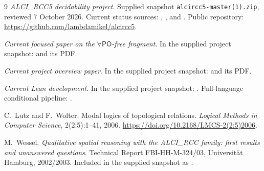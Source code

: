 \documentclass[11pt,letterpaper]{article}
\newcommand{\PO}{\mathsf{PO}}
\theoremstyle{definition}
\theoremstyle{remark}
\begin{document}
\begin{thebibliography}{9}
\small
{}
\textit{ALCI\_RCC5 decidability project}.
Supplied snapshot \texttt{alcircc5-master(1).zip}, reviewed
7 October 2026. Current status sources: ,
, and
.
Public repository: \url{https://github.com/lambdamikel/alcircc5}.

\textit{Current focused paper on the $\forall\PO$-free fragment}.
In the supplied project snapshot:
 and its PDF.

\textit{Current project overview paper}.
In the supplied project snapshot:
 and its PDF.

\textit{Current Lean development}.
In the supplied project snapshot: .
Full-language conditional pipeline:
.

C.~Lutz and F.~Wolter.
Modal logics of topological relations.
\textit{Logical Methods in Computer Science}, 2(2:5):1--41, 2006.
\url{https://doi.org/10.2168/LMCS-2(2:5)2006}.

M.~Wessel.
\textit{Qualitative spatial reasoning with the ALCI\_RCC family:
first results and unanswered questions}.
Technical Report FBI-HH-M-324/03, Universit\"at Hamburg, 2002/2003.
Included in the supplied snapshot as .
\end{thebibliography}
\end{document}
